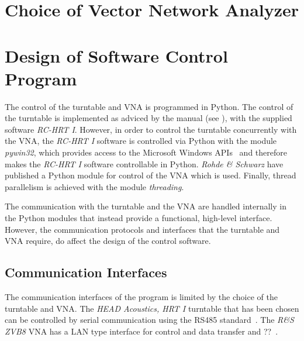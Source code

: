 \section{Choice of Vector Network Analyzer}


\section{Design of Software Control Program}
The control of the turntable and VNA is programmed in Python. The control of the turntable is implemented as adviced by the manual (see \cite{hrt_i_manual}), with the supplied software \textit{RC-HRT I}. However, in order to control the turntable concurrently with the VNA, the \textit{RC-HRT I} software is controlled via Python with the module \textit{pywin32}, which provides access to the Microsoft Windows APIs~\cite{pywin32} and therefore makes the \textit{RC-HRT I} software controllable in Python. \textit{Rohde \& Schwarz} have published a Python module for control of the VNA which is used. Finally, thread parallelism is achieved with the module \textit{threading}.

The communication with the turntable and the VNA are handled internally in the Python modules that instead provide a functional, high-level interface. However, the communication protocols and interfaces that the turntable and VNA require, do affect the design of the control software. %

\subsection{Communication Interfaces}
The communication interfaces of the program is limited by the choice of the turntable and VNA. The \textit{HEAD Acoustics, HRT I} turntable that has been chosen can be controlled by serial communication using the RS485 standard~\cite{hrt_i_data_sheet}. The \textit{R\&S ZVB8} VNA has a LAN type interface for control and data transfer and ??~\cite{vna_data_sheet_descrip}.


